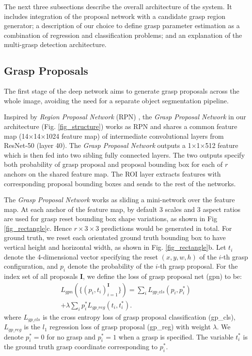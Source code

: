 \documentclass[letterpaper, 10 pt, journal, twoside]{IEEEtran}
\begin{document}
The next three subsections describe the overall architecture of the
system.  It includes integration of the proposal network with a
candidate grasp region generator; a description of our choice to define
grasp parameter estimation as a combination of regression and
classification problems; and an explanation of the multi-grasp detection
architecture.    

\subsection{Grasp Proposals}




The first stage of the deep network aims to generate grasp proposals across
the whole image, avoiding the need for a separate object segmentation
pipeline. 

Inspired by \emph{Region Proposal Network} (RPN) \cite{ren2015faster}, 
the \emph{Grasp Proposal Network} in our architecture (Fig. \ref{fig_structure}) works as RPN and shares a common
feature map (14$\times$14$\times$1024 feature map) of intermediate convolutional layers from ResNet-50 (layer 40). The \emph{Grasp Proposal Network} outputs a
1$\times$1$\times$512 feature which is then fed into two sibling fully connected layers. The
two outputs specify both probability of grasp proposal and proposal bounding
box for each of $r$ anchors on the shared feature map. The ROI layer extracts features with corresponding proposal bounding boxes and sends to the rest of the networks.

The \emph{Grasp Proposal Network} works as sliding a mini-network
over the feature map.  
At each anchor of the feature map, by default 3 scales and 3 aspect ratios are used for grasp
reset bounding box shape variations, as shown in Fig \ref{fig_rectangle}c.  Hence $r \times 3 \times 3$ predictions would be generated in total. For ground truth, we reset each orientated ground truth bounding box to have vertical height and
horizontal width, as shown in Fig. \ref{fig_rectangle}b. Let $t_i$ denote the
4-dimensional vector specifying the reset $(x,y,w,h)$ of the $i$-th grasp
configuration, and $p_i$ denote the probability of the $i$-th grasp
proposal. 
For the index set of all proposals $\mathbf{I}$,
we define the loss of grasp proposal net (gpn) to be: 
\begin{multline}
  L_{gpn}(\{(p_i,t_i)_{i=1}^\mathbf{I}\}) 
    = \sum_i L_{gp\_cls}(p_i, p_i^{\ast})  \\
      + \lambda \sum_i p_i^{\ast} L_{gp\_reg}(t_i, t_i^{\ast}). 
\end{multline}
where $L_{gp\_cls}$ is the cross entropy loss of grasp proposal
classification (gp\_cls), $L_{gp\_reg}$ is the $l_1$ regression loss of
grasp proposal (gp\_reg) with weight $\lambda$. 
We denote $p_i^{\ast} = 0$ for no grasp and $p_i^{\ast} = 1$ when
a grasp is specified. The variable $t_i^{\ast}$ is the ground truth grasp
coordinate corresponding to $p_i^{\ast}$. 
\end{document}
